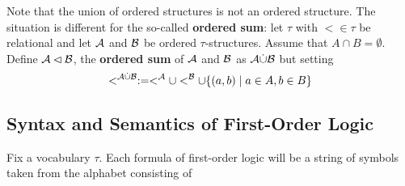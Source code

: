 \documentclass[11pt]{article}
\begin{document}
Note that the union of ordered structures is not an ordered structure. The situation is
different for the so-called \textbf{ordered sum}: let \(\tau\) with \(<\in\tau\) be relational and
let \(\mathcal{A}\) and \(\mathcal{B}\) be ordered \(\tau\)-structures. Assume that \(A\cap B=\emptyset\).
Define \(\mathcal{A}\lhd\mathcal{B}\), the \textbf{ordered sum} of \(\mathcal{A}\) and \(\mathcal{B}\) as \(\mathcal{A}\dot\cup\mathcal{B}\)
but setting
\begin{equation*}
<^{\mathcal{A}\dot\cup\mathcal{B}}:=<^{\mathcal{A}}\cup <^{\mathcal{B}}\cup
\{(a,b)\mid a\in A,b\in B\}
\end{equation*}
\subsection{Syntax and Semantics of First-Order Logic}
\label{sec:org30652b9}
Fix a vocabulary \(\tau\). Each formula of first-order logic will be a string of symbols taken from the
alphabet consisting of
\end{document}
